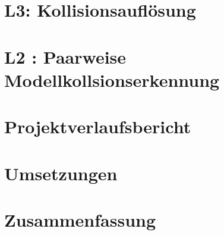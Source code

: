 \documentclass[11pt,twoside,a4paper]{article}
\begin{document}
\section{L3: Kollisionsauflösung}

\section{L2 : Paarweise Modellkollsionserkennung}


\section{Projektverlaufsbericht}
\section{Umsetzungen}

\section{Zusammenfassung}


\newpage

\begin{thebibliography}{12}




\end{thebibliography}
\end{document}
